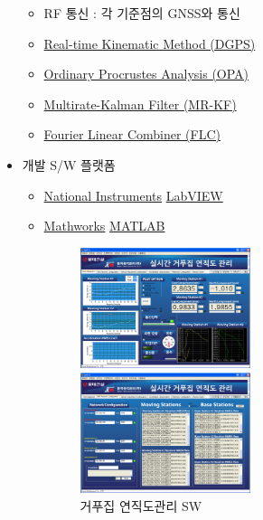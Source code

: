 \documentclass[10pt,a4paper,ragged2e]{altacv}
\begin{document}
\begin{fullwidth}
\begin{itemize}
\begin{itemize}
    \item RF 통신 : 각 기준점의 GNSS와 통신
    \item \href{https://en.wikipedia.org/wiki/Differential_GPS}{Real-time Kinematic Method (DGPS)}
    \item \href{https://en.wikipedia.org/wiki/Procrustes_analysis}{Ordinary Procrustes Analysis (OPA)}
    \item \href{http://scholar.lib.vt.edu/theses/available/etd-062899-064821/unrestricted/etd.PDF}{Multirate-Kalman  Filter (MR-KF)}
    \item \href{http://ieeexplore.ieee.org/xpl/login.jsp?tp=\&arnumber=258116\&url=http\%3A\%2F\%2Fieeexplore.ieee.org\%2Fxpls\%2Fabs_all.jsp\%3Farnumber\%3D258116}{Fourier Linear Combiner (FLC)}
  \end{itemize}
\item 개발 S/W 플랫폼
\begin{itemize}
  \item \href{https://en.wikipedia.org/wiki/National_Instruments}{National Instruments} \href{https://en.wikipedia.org/wiki/LabVIEW}{LabVIEW}
  \item \href{https://en.wikipedia.org/wiki/MathWorks}{Mathworks} \href{https://en.wikipedia.org/wiki/MATLAB}{MATLAB}
  \begin{figure}[ht]
    \begin{fullwidth}
    \centering
    \parbox{0.5\textwidth}{
      \includegraphics[width=0.5\textwidth] {images/gps_01.png}
      \caption*{거푸집 연직도관리 SW}
    }\qquad
    \parbox{0.5\textwidth}{
      \includegraphics[width=0.5\textwidth] {images/gps_02.png}
}
\end{fullwidth}
\end{figure}
\end{itemize}
\end{itemize}
\end{fullwidth}
\end{document}
